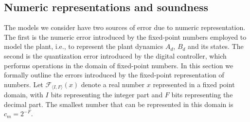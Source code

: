 \documentclass[runningheads,a4paper]{llncs}
\begin{document}
\subsection{Numeric representations and soundness} 
\label{sec:numeric_rep}


The models we consider have two sources of error due to numeric representation. 
The first is the numeric error introduced by the fixed-point numbers employed to model the plant, i.e., to represent the plant dynamics $A_d$, $B_d$ and its states. 
The second is the quantization error introduced by the digital controller, 
which performs operations in the domain of fixed-point numbers. 
In this section we formally outline the errors introduced by the fixed-point representation of numbers. 
% 
Let $\mathcal{F}_{\langle I,F \rangle}(x)$ denote a real number $x$ represented in a fixed point domain, with $I$ bits representing the integer part and $F$ bits representing the decimal part. The smallest number that can be represented in this domain is $c_m=2^{-F}$.
\end{document}
